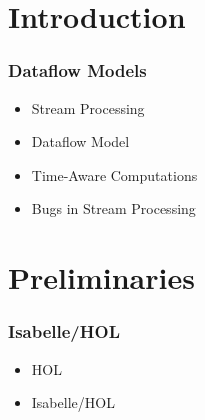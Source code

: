 \documentclass[aspectratio=169,10pt]{beamer}
\begin{document}
\section{Introduction}

\begin{frame}[fragile]
  \frametitle{Dataflow Models}
  \begin{itemize}
    \item Stream Processing
    \item Dataflow Model
    \item Time-Aware Computations
    \item Bugs in Stream Processing
  \end{itemize}
\end{frame}

\section{Preliminaries}
\begin{frame}[fragile]
  \frametitle{Isabelle/HOL}
  \begin{itemize}
    \item HOL
    \item Isabelle/HOL
  \end{itemize}
\end{frame}

\end{document}
